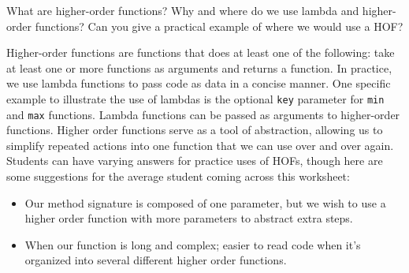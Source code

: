 \begin{blocksection}
\question What are higher-order functions? Why and where do we use lambda and higher-order functions? Can you give a practical example of where we would use a HOF?

\begin{solution}[0.5in]
Higher-order functions are functions that does at least one of the following: take at least one or more functions as arguments and returns a function. 
In practice, we use lambda functions to pass code as data in a concise manner. One specific example to illustrate the use of lambdas is the optional \lstinline{key} parameter for \lstinline{min} and \lstinline{max} functions. Lambda functions can be passed as arguments to higher-order functions.
Higher order functions serve as a tool of abstraction, allowing us to simplify repeated actions into one function that we can use over and over again. 
Students can have varying answers for practice uses of HOFs, though here are some suggestions for the average student coming across this worksheet:
\begin{itemize}
    \item Our method signature is composed of one parameter, but we wish to use a higher order function with more parameters to abstract extra steps.
    \item When our function is long and complex; easier to read code when it's organized into several different higher order functions.
\end{itemize}

\end{solution}
\end{blocksection}